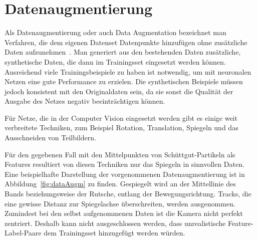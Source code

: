 


\section{Datenaugmentierung}




Als Datenaugmentierung oder auch Data Augmentation bezeichnet man Verfahren, die dem eigenen Datenset Datenpunkte hinzufügen ohne zusätzliche Daten aufzunehmen~\cite[Kapitel 7.4]{Goodfellow-et-al-2016}.
Man generiert aus den bestehenden Daten zusätzliche, synthetische Daten, die dann im Trainingsset eingesetzt werden können.
Ausreichend viele Trainingsbeispiele zu haben ist notwendig, um mit neuronalen Netzen eine gute Performance zu erzielen.
Die synthetischen Beispiele müssen jedoch konsistent mit den Originaldaten sein, da sie sonst die Qualität der Ausgabe des Netzes negativ beeinträchtigen können.

Für Netze, die in der Computer Vision eingesetzt werden gibt es einige weit verbreitete Techniken,
zum Beispiel Rotation, Translation, Spiegeln und das Ausschneiden von Teilbildern.

Für den gegebenen Fall mit den Mittelpunkten von Schüttgut-Partikeln als Features resultiert von diesen Techniken nur das Spiegeln in sinnvollen Daten.
Eine beispielhafte Darstellung der vorgenommenen Datenaugmentierung ist in Abbildung~\ref{fig:dataAugm} zu finden.
Gespiegelt wird an der Mittellinie des Bands beziehungsweise der Rutsche, entlang der Bewegungsrichtung.
Tracks, die eine gewisse Distanz zur Spiegelachse überschreiten, werden ausgenommen.
Zumindest bei den selbst aufgenommenen Daten ist die Kamera nicht perfekt zentriert.
Deshalb kann nicht ausgeschlossen werden, 
dass unrealistische Feature-Label-Paare dem Trainingsset hinzugefügt werden würden.

